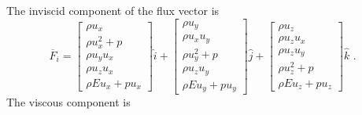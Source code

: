 \documentclass[12pt,a4paper,twoside]{article}
\begin{document}
The inviscid component of the flux vector is
\begin{equation}
 \overline{F}_{i} = \left [ \begin{array}{c}
                               \rho u_{x} \\
                               \rho u_{x}^{2} + p \\
                               \rho u_{y} u_{x} \\
                               \rho u_{z} u_{x} \\
                               \rho E u_{x} + p u_{x}
                            \end{array} \right ] \hat{i} 
                  + \left [ \begin{array}{c} 
                               \rho u_{y} \\
                               \rho u_{x} u_{y} \\
                               \rho u_{y}^{2} + p \\
                               \rho u_{z} u_{y} \\
                               \rho E u_{y} + p u_{y}
                            \end{array} \right ] \hat{j} 
                  + \left [ \begin{array}{c} 
                               \rho u_{z} \\
                               \rho u_{z} u_{x} \\
                               \rho u_{z} u_{y} \\
                               \rho u_{z}^{2} + p \\
                               \rho E u_{z} + p u_{z}
                            \end{array} \right ] \hat{k} 
                 \text{ . }
 \label{eq:F_i_3D}
\end{equation}
The viscous component is
\end{document}
